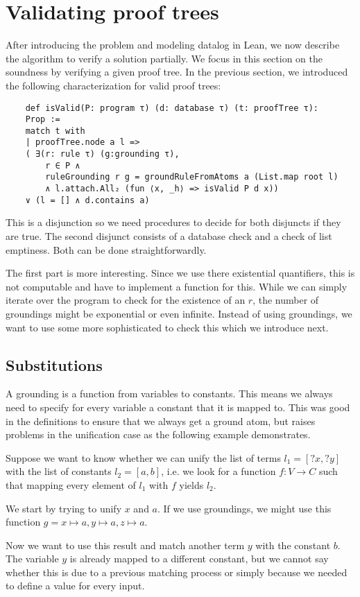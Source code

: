 \section{Validating proof trees}\label{sec:valTree}

After introducing the problem and modeling datalog in Lean, we now describe the algorithm to verify a solution partially. We focus in this section on the soundness by verifying a given proof tree. In the previous section, we introduced the following characterization for valid proof trees:

\begin{lstlisting}
    def isValid(P: program τ) (d: database τ) (t: proofTree τ): 
    Prop :=
    match t with
    | proofTree.node a l => 
    ( ∃(r: rule τ) (g:grounding τ), 
        r ∈ P ∧ 
        ruleGrounding r g = groundRuleFromAtoms a (List.map root l)
        ∧ l.attach.All₂ (fun ⟨x, _h⟩ => isValid P d x)) 
    ∨ (l = [] ∧ d.contains a)
\end{lstlisting}

This is a disjunction so we need procedures to decide for both disjuncts if they are true.
The second disjunct consists of a database check and a check of list emptiness. Both can be done straightforwardly.

The first part is more interesting. Since we use there existential quantifiers, this is not computable and have to implement a function for this. While we can simply iterate over the program to check for the existence of an $r$, the number of groundings might be exponential or even infinite. Instead of using groundings, we want to use some more sophisticated to check this which we introduce next.


\subsection{Substitutions}
    A grounding is a function from variables to constants. This means we always need to specify for every variable a constant that it is mapped to. This was good in the definitions to ensure that we always get a ground atom, but raises problems in the unification case as the following example demonstrates.

    \begin{example}\label{ex:subsGroun}
        Suppose we want to know whether we can unify the list of terms $l_1 = [?x, ?y]$ with the list of constants $l_2= [a,b]$, i.e. we look for a function $f: V \to C$ such that mapping every element of $l_1$ with $f$ yields $l_2$.

        We start by trying to unify $x$ and $a$. If we use groundings, we might use this function $g = x \mapsto a, y \mapsto a, z \mapsto a$.

        Now we want to use this result and match another term $y$ with the constant $b$. The variable $y$ is already mapped to a different constant, but we cannot say whether this is due to a previous matching process or simply because we needed to define a value for every input.         
    \end{example}
    
